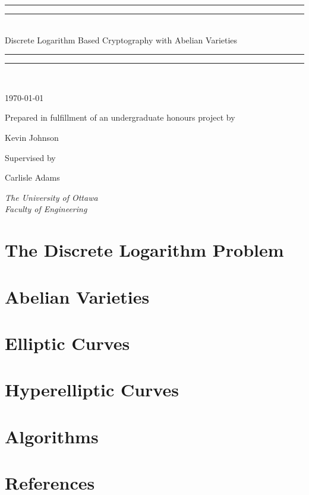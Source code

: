 \documentclass[10pt,a4paper]{article}
\newcommand*{\titleGP}{ %
  \begingroup %
    \centering %
    \vspace*{\baselineskip} %
    \rule{\textwidth}{1.6pt}\vspace*{-\baselineskip}\vspace*{2pt} %
    \rule{\textwidth}{0.4pt}\\[\baselineskip] %
    {\huge Discrete Logarithm Based Cryptography with Abelian Varieties}\\[0.2\baselineskip] %
    \rule{\textwidth}{0.4pt}\vspace*{-\baselineskip}\vspace{3.2pt} %
    \rule{\textwidth}{1.6pt}\\[\baselineskip] %

    \scshape %
    {\Large \today \par} %
    \vspace*{2\baselineskip} %
    Prepared in fulfillment of an undergraduate honours project by \\[\baselineskip]
    {\Large Kevin Johnson \par} %
    \vspace*{2\baselineskip} 
    Supervised by \\
    \vspace*{2\baselineskip}
    {\Large Carlisle Adams \par}
    \vspace*{2\baselineskip}
    {\itshape The University of Ottawa \\ Faculty of Engineering \par} %
    \vspace*{2\baselineskip} 
  \endgroup
}
\begin{document}
  \titleGP
  \begin{abstract}
    In recent years there has been increased interest in public key cryptography utilizes the group of points on elliptic curves. In this report we develop notions central to cryptography using elliptic curves and generalize thess ideas to hyperelliptic curves. A discussion of even more general geometric objects, called abelian varieties, is also given. Explicit descriptions for algorithms needed to implement public key cryptography supplement the discussion. Throughout this report, all curves are defined over the field $\mathbb{F}_p$ where $p$ is an odd prime.  
  \end{abstract}
  \newpage
  \tableofcontents
  \newpage
  
  \section{The Discrete Logarithm Problem}
    
  \section{Abelian Varieties}
    
  \section{Elliptic Curves}
    
  \section{Hyperelliptic Curves}
    
    \newpage
  \section{Algorithms} \label{algos}
     
    \newpage
  \section{References}
    
\end{document}
